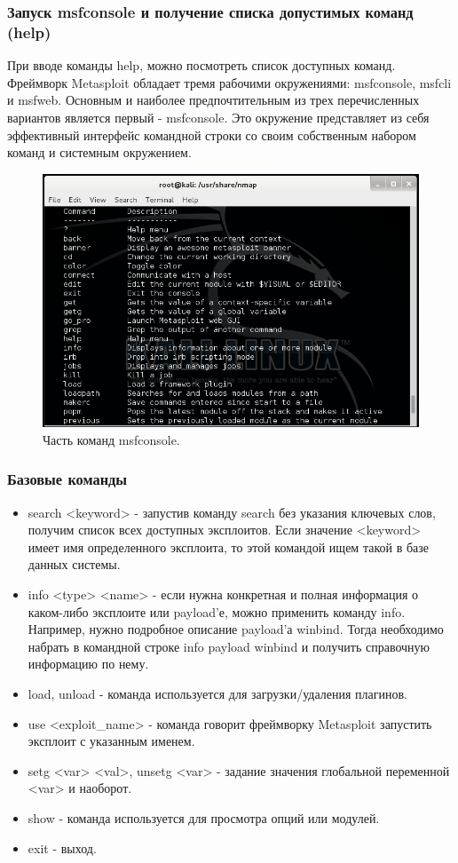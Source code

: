 \documentclass[a4paper, 14pt]{article}				%
\begin{document}
\subsubsection{Запуск msfconsole и получение списка допустимых команд (help)}
При вводе команды help, можно посмотреть список доступных команд. Фреймворк Metasploit обладает тремя рабочими окружениями: msfconsole, msfcli и msfweb. Основным и наиболее предпочтительным из трех перечисленных вариантов является первый - msfconsole. Это окружение представляет из себя эффективный интерфейс командной строки со своим собственным набором команд и системным окружением.
\begin{figure}[h!]
\centering
\includegraphics[width=\textwidth]{rsrc/lab5_msfhelp}
\caption{Часть команд msfconsole.}
\end{figure}

\subsubsection{Базовые команды}
\begin{itemize}
\item search <keyword> - запустив команду search без указания ключевых слов, получим список всех доступных эксплоитов. Если значение <keyword> имеет имя определенного эксплоита, то этой командой ищем такой в базе данных системы.
\item info <type> <name> - если нужна конкретная и полная информация о каком-либо эксплоите или payload’е, можно применить команду info. Например, нужно подробное описание payload’а winbind. Тогда необходимо набрать в командной строке info payload winbind и получить справочную информацию по нему.
\item load, unload - команда используется для загрузки/удаления плагинов.
\item use <exploit\_name> - команда говорит фреймворку Metasploit запустить эксплоит с указанным именем.
\item setg <var> <val>, unsetg <var> - задание значения глобальной переменной <var> и наоборот.
\item show - команда используется для просмотра опций или модулей.

\item exit - выход.
\end{itemize}
\end{document}
